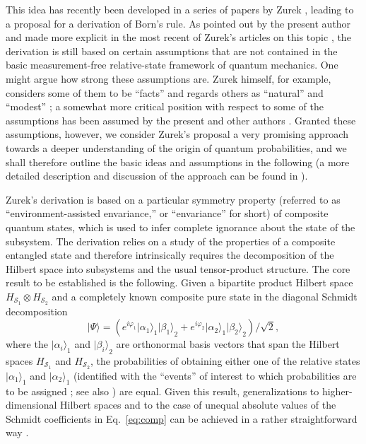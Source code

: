 \documentclass[12pt,aps,floatfix,amsmath,amssymb,showpacs,nofootinbib]{revtex4-2}
\newcommand{\be}{\begin{equation}} \newcommand{\ee}{\end{equation}}
\newcommand{\ket}[1]{\ensuremath{|{#1\rangle}}}
\begin{document}
This idea has recently been developed in a series of papers by Zurek
\cite{Zurek:2002:ii,Zurek:2003:rv,Zurek:2003:pl,Zurek:2004:yb},
leading to a proposal for a derivation of Born's rule. As pointed out
by the present author \cite{Schlosshauer:2003:ms,Schlosshauer:2003:tv}
and made more explicit in the most recent of Zurek's articles on this
topic \cite{Zurek:2004:yb}, the derivation is still based on certain
assumptions that are not contained in the basic measurement-free
relative-state framework of quantum mechanics. One might argue how
strong these assumptions are. Zurek himself, for example, considers
some of them to be ``facts'' and regards others as ``natural'' and
``modest'' \cite{Zurek:2004:yb}; a somewhat more critical position
with respect to some of the assumptions has been assumed by the
present \cite{Schlosshauer:2003:ms} and other authors
\cite{Barnum:2003:yb,Mohrhoff:2004:tv}.  Granted these
assumptions, however, we consider Zurek's proposal a very promising
approach towards a deeper understanding of the origin of quantum
probabilities, and we shall therefore outline the basic ideas and
assumptions in the following (a more detailed description and
discussion of the approach can be found in
\cite{Zurek:2002:ii,Schlosshauer:2003:ms,Schlosshauer:2003:tv,Zurek:2004:yb}).

Zurek's derivation is based on a particular symmetry property
(referred to as ``environment-assisted envariance,'' or ``envariance''
for short) of composite quantum states, which is used to infer
complete ignorance about the state of the subsystem. The derivation
relies on a study of the properties of a composite entangled state and
therefore intrinsically requires the decomposition of the Hilbert
space into subsystems and the usual tensor-product structure. The core
result to be established is the following. Given a bipartite product
Hilbert space $H_{\mathcal{S}_1} \otimes H_{\mathcal{S}_2}$ and a completely
known composite pure state in the diagonal Schmidt decomposition
%
\be \label{eq:comp}
\ket{\Psi} = \left( e^{i\varphi_1} \ket{\alpha_1}_1 \ket{\beta_1}_2
+ e^{i\varphi_2} \ket{\alpha_2}_1 \ket{\beta_2}_2 \right) / \sqrt{2},
\ee
%
where the $\ket{\alpha_i}_1$ and $\ket{\beta_i}_2$ are orthonormal
basis vectors that span the Hilbert spaces $H_{\mathcal{S}_1}$ and
$H_{\mathcal{S}_2}$, the probabilities of obtaining either one of the
relative states $\ket{\alpha_1}_1$ and $\ket{\alpha_2}_1$ (identified
with the ``events'' of interest to which probabilities are to be
assigned \cite[p.~12]{Zurek:2003:pl}; see also
\cite{Schlosshauer:2003:ms}) are equal. Given this result,
generalizations to higher-dimensional Hilbert spaces and to the case
of unequal absolute values of the Schmidt coefficients in
Eq.~\eqref{eq:comp} can be achieved in a rather straightforward way
\cite{Zurek:2004:yb}.
\end{document}
